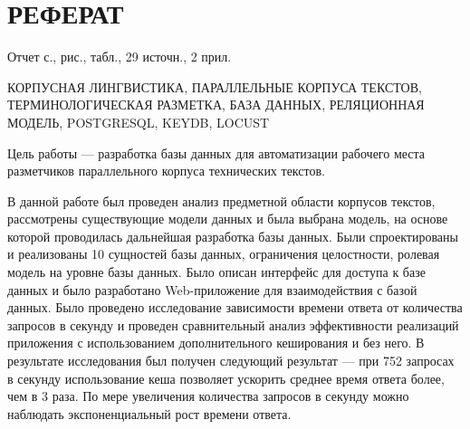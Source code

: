 \section*{РЕФЕРАТ}

Отчет \pageref{LastPage} с.,  рис.,  табл., 29 источн., 2 прил.

КОРПУСНАЯ ЛИНГВИСТИКА,
ПАРАЛЛЕЛЬНЫЕ КОРПУСА ТЕКСТОВ,
ТЕРМИНОЛОГИЧЕСКАЯ РАЗМЕТКА,
БАЗА ДАННЫХ,
РЕЛЯЦИОННАЯ МОДЕЛЬ,
POSTGRESQL,
KEYDB,
LOCUST

Цель работы --- разработка базы данных для автоматизации рабочего места разметчиков параллельного корпуса технических текстов.

В данной работе был проведен анализ предметной области корпусов текстов, рассмотрены существующие модели данных и была выбрана модель, на основе которой проводилась дальнейшая разработка базы данных.
Были спроектированы и реализованы 10 сущностей базы данных, ограничения целостности, ролевая модель на уровне базы данных.
Было описан интерфейс для доступа к базе данных и было разработано Web-приложение для взаимодействия с базой данных.
Было проведено исследование зависимости времени ответа от количества запросов в секунду и проведен сравнительный анализ эффективности реализаций приложения с использованием дополнительного кеширования и без него.
В результате исследования был получен следующий результат --- при 752 запросах в секунду использование кеша позволяет ускорить среднее время ответа более, чем в 3 раза.
По мере увеличения количества запросов в секунду можно наблюдать экспоненциальный рост времени ответа.

